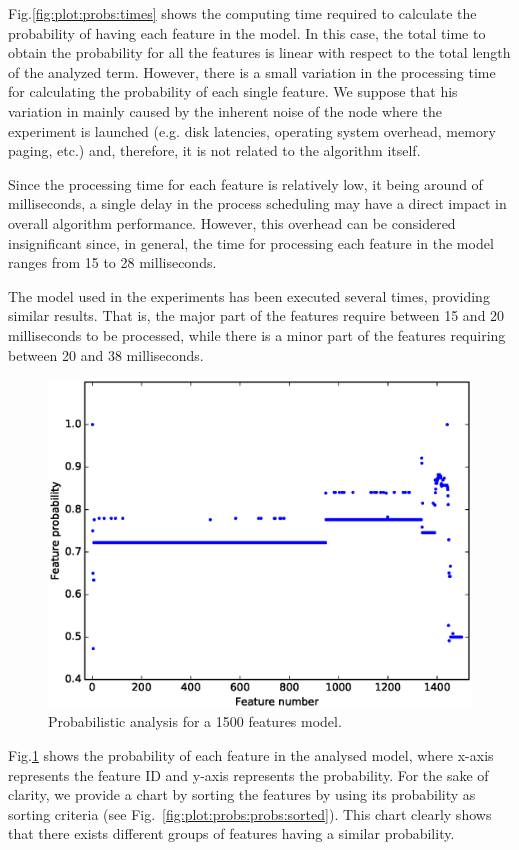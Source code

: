 Fig.\ref{fig:plot:probs:times} shows the computing time required to calculate the probability of having 
each feature in the model. In this case, the total time to obtain the probability for all the features is linear 
with respect to the total length of the analyzed term. However, there is a small variation in the processing time 
for calculating the probability of each single feature. We suppose that his variation in mainly 
caused by the inherent noise of the node where the experiment is launched (e.g. disk latencies, operating 
system overhead, memory paging, etc.) and, therefore, it is not related to the algorithm itself.

Since the processing time for each feature is relatively low, it being around of milliseconds, a single delay in 
the process scheduling may have a direct impact in overall algorithm performance. However, this overhead 
can be considered insignificant since, in general, the time for processing each feature in the model ranges 
from 15 to 28 milliseconds. 

The model used in the experiments has been executed several times, providing similar results. That is, the 
major part of the features require between 15 and 20 milliseconds to be processed, while there is a minor 
part of the features requiring between 20 and 38 milliseconds.

\begin{figure}[h]
	\centering
	\linefigure
	\includegraphics[width=0.8\hsize,angle=0]{plot_probs_probs.eps}
	\linefigure
	\caption{Probabilistic analysis for a 1500 features model.}\label{fig:plot:probs:probs}
\end{figure}

Fig.\ref{fig:plot:probs:probs} shows the probability of each feature in the analysed model, where x-axis 
represents the feature ID and y-axis represents the probability. For the sake of clarity, we provide a chart by 
sorting the features by using its probability as sorting criteria (see Fig.~\ref{fig:plot:probs:probs:sorted}). 
This chart clearly shows that there exists different groups of features having a similar probability.

